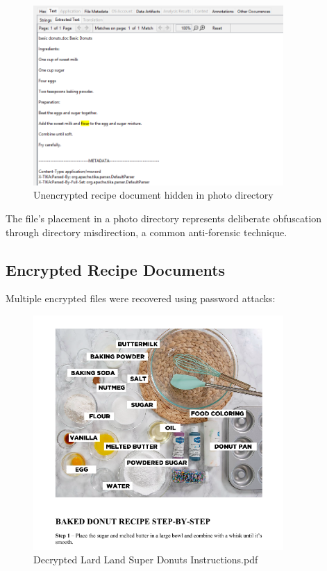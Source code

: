 \begin{figure}[htbp]
    \centering
    \includegraphics[width=0.85\textwidth]{images/Artifact and Evidence Recovery/BasicDonuts.png}
    \caption{Unencrypted recipe document hidden in photo directory}
    \label{fig:basic_donuts}
\end{figure}

The file's placement in a photo directory represents deliberate obfuscation through directory misdirection, a common anti-forensic technique.

\subsection{Encrypted Recipe Documents}
Multiple encrypted files were recovered using password attacks:

\begin{figure}[htbp]
    \centering
    \includegraphics[width=0.85\textwidth]{images/Artifact and Evidence Recovery/LardLandPDF.png}
    \caption{Decrypted Lard Land Super Donuts Instructions.pdf}
    \label{fig:decrypted_pdf}
\end{figure}

